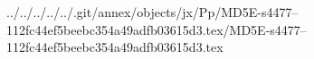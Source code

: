 ../../../../../.git/annex/objects/jx/Pp/MD5E-s4477--112fc44ef5beebc354a49adfb03615d3.tex/MD5E-s4477--112fc44ef5beebc354a49adfb03615d3.tex